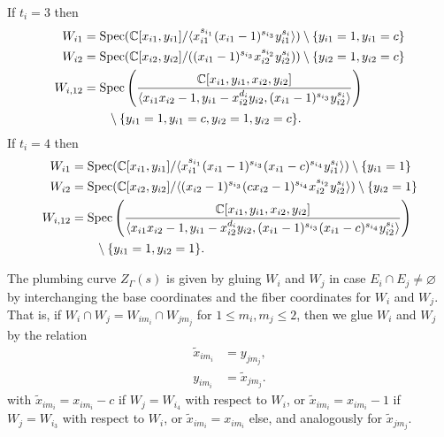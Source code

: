 \documentclass[a4paper, reqno, twoside]{amsart}
\theoremstyle{definition}
\numberwithin{equation}{section}
\begin{document}
If $t_i=3$ then
\begin{align*}\allowdisplaybreaks
W_{i1} &= \operatorname{Spec}(\mathbb{C}[x_{i1}, y_{i1}]/\langle x_{i1}^{s_{i_1}}(x_{i1}-1)^{s_{i_3}} y_{i1}^{s_i}\rangle) \setminus \{y_{i1}=1, y_{i1}=c\}\\
W_{i2} &= \operatorname{Spec}(\mathbb{C}[x_{i2}, y_{i2}]/((x_{i1}-1)^{s_{i_3}} x_{i2}^{s_{i_2}} y_{i2}^{s_i})) \setminus \{y_{i2}=1, y_{i2}=c\}\\
W_{i,12} &= \operatorname{Spec}\left(\frac{\mathbb{C}[x_{i1}, y_{i1}, x_{i2}, y_{i2}]}{\langle x_{i1}x_{i2}-1, y_{i1}-x_{i2}^{d_i}y_{i2}, (x_{i1}-1)^{s_{i_3}}y_{i2}^{s_i}\rangle}\right) \\
&\qquad \setminus \{y_{i1}=1, y_{i1}=c, y_{i2}=1, y_{i2}=c\}.
\end{align*}
If $t_i=4$ then
\begin{align*}\allowdisplaybreaks
W_{i1} &= \operatorname{Spec}(\mathbb{C}[x_{i1}, y_{i1}]/\langle x_{i1}^{s_{i_1}}(x_{i1}-1)^{s_{i_3}}(x_{i1}-c)^{s_{i_4}}y_{i1}^{s_i}\rangle) \setminus \{y_{i1}=1\} \\
W_{i2} &= \operatorname{Spec}(\mathbb{C}[x_{i2}, y_{i2}]/\langle (x_{i2}-1)^{s_{i_3}} (cx_{i2}-1)^{s_{i_4}} x_{i2}^{s_{i_2}} y_{i2}^{s_i}\rangle) \setminus \{y_{i2}=1\} \\
W_{i,12} &= \operatorname{Spec}\left(\frac{\mathbb{C}[x_{i1}, y_{i1}, x_{i2}, y_{i2}]}{\langle x_{i1}x_{i2}-1, y_{i1}-x_{i2}^{d_i}y_{i2}, (x_{i1}-1)^{s_{i_3}}(x_{i1}-c)^{s_{i_4}}y_{i2}^{s_i}
\rangle}\right) \\
&\qquad \setminus\{y_{i1}=1, y_{i2}=1\}.
\end{align*}

The plumbing curve $Z_{\Gamma}(s)$ is given by gluing $W_i$ and $W_j$ in case
$E_i \cap E_j \neq \varnothing$ by interchanging the base coordinates and the
fiber coordinates for $W_i$ and $W_j$. That is, if $W_i \cap W_j = W_{im_i}
\cap W_{jm_j}$ for $1 \le m_i, m_j \le 2$, then we glue $W_i$ and $W_j$ by the
relation
\begin{equation}\label{equation:gluing-map-maximal}
\begin{aligned}
\widetilde{x}_{im_i} &= y_{jm_j}, \\
y_{im_i} &= \widetilde{x}_{jm_j}.
\end{aligned}
\end{equation}
with $\widetilde{x}_{im_i}=x_{im_i}-c$ if $W_j=W_{i_4}$ with respect to $W_i$, or $\widetilde{x}_{im_i}=x_{im_i}-1$ if $W_j=W_{i_3}$ with respect to $W_i$, or $\widetilde{x}_{im_i}=x_{im_i}$ else, and analogously for $\widetilde{x}_{jm_j}$.
\end{document}
